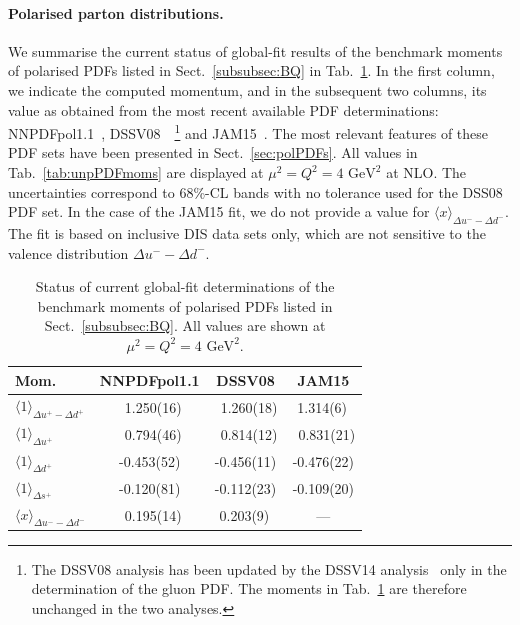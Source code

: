 \paragraph{Polarised parton distributions.}
%
We summarise the current status of global-fit results of the benchmark
moments of polarised PDFs listed in Sect.~\ref{subsubsec:BQ} in 
Tab.~\ref{tab:polPDFmoms}.
%
In the first column, we indicate the computed momentum, and in the subsequent 
two columns, its value as obtained from the most recent available PDF 
determinations: NNPDFpol1.1~\cite{Nocera:2014gqa}, 
DSSV08~\cite{deFlorian:2009vb}~\footnote{The DSSV08 analysis has been updated
by the DSSV14 analysis~\cite{deFlorian:2014yva} only in the determination
of the gluon PDF. The moments in Tab.~\ref{tab:polPDFmoms} are therefore  
unchanged in the two analyses.} and JAM15~\cite{Sato:2016tuz}.
%
The most relevant features of these PDF sets have been presented in
Sect.~\ref{sec:polPDFs}.
%
All values in Tab.~\ref{tab:unpPDFmoms} are displayed
at $\mu^2=Q^2=4\mbox{ GeV}^2$ at NLO.
%
The uncertainties correspond to 68\%-CL bands with no tolerance used for the 
DSS08 PDF set.
%
In the case of the JAM15 fit, we do not provide a value for 
$\langle x \rangle _{\Delta u^--\Delta d^-}$.
%
The fit is based on inclusive DIS data sets only, which are not sensitive to 
the valence distribution $\Delta u^- - \Delta d^-$.

\begin{table}[!t]
\centering
\renewcommand{\arraystretch}{1.2}
\begin{tabular}{lccc}
\toprule
Mom. 
& NNPDFpol1.1 & DSSV08 & JAM15 \\
\midrule
$\langle 1 \rangle_{\Delta u^+-\Delta d^+}$ &
\ 1.250(16) & \ 1.260(18) & 1.314(6)\, \\
$\langle 1 \rangle_{\Delta u^+}$ &
\ 0.794(46) & \ 0.814(12) & \ 0.831(21)\\
$\langle 1 \rangle_{\Delta d^+}$ &  
-0.453(52)  &  -0.456(11) &  -0.476(22)\\
$\langle 1 \rangle_{\Delta s^+}$ &  
-0.120(81)  &  -0.112(23) &  -0.109(20)\\
$\langle x \rangle_{\Delta u^- - \Delta d^-}$ &     
\ 0.195(14) &  0.203(9)\, &  --- \\
\bottomrule
\end{tabular}
\caption{\small Status of current global-fit determinations of the 
benchmark moments of polarised PDFs listed in Sect.~\ref{subsubsec:BQ}.
All values are shown at $\mu^2=Q^2=4\mbox{ GeV}^2$.}
\label{tab:polPDFmoms}
\end{table}

